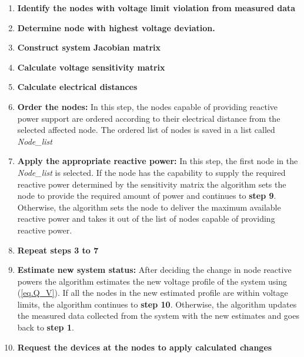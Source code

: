 \begin{enumerate}
\item \textbf{Identify the nodes with voltage limit violation from measured data}
\item \textbf{Determine node with highest voltage deviation.}
\item \textbf{Construct system Jacobian matrix}
\item \textbf{Calculate voltage sensitivity matrix}
\item \textbf{Calculate electrical distances}
\item \textbf{Order the nodes:} In this step, the nodes capable of providing reactive power support are ordered according to their electrical distance from the selected affected node. The ordered list of nodes is saved in a list called \textit{Node\_list}
\item \textbf{Apply the appropriate reactive power:} In this step, the first node in the \textit{Node\_list} is selected. If the node has the capability to supply the required reactive power determined by the sensitivity matrix the algorithm sets the node to provide the required amount of power and continues to \textbf{step 9}. Otherwise, the algorithm sets the node to deliver the maximum available reactive power and takes it out of the list of nodes capable of providing reactive power.
\item \textbf{Repeat steps 3 to 7}
\item \textbf{Estimate new system status:} After deciding the change in node reactive powers the algorithm estimates the new voltage profile of the system using (\ref{eq.Q_V}). If all the nodes in the new estimated profile are within voltage limits, the algorithm continues to \textbf{step 10}. Otherwise, the algorithm updates the measured data collected from the system with the new estimates and goes back to  \textbf{step 1}.

\item \textbf{Request the devices at the nodes to apply calculated changes}
\end{enumerate}